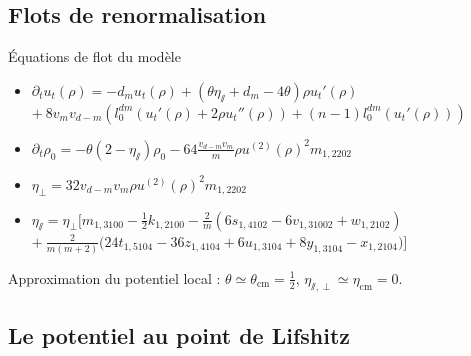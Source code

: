 \documentclass[xcolor=dvipsnames]{beamer}
\begin{document}
\subsection{Flots de renormalisation}
\begin{frame}

\begin{block}{Équations de flot du modèle}
\begin{itemize}
\item $\partial_t u_t(\rho) = -d_m u_t(\rho) + (\theta \eta_\sslash + d_m - 4 \theta) \rho u_t'(\rho)$ \\
\hfill $+~8 v_m v_{d-m} \left( l_0^{dm}\left(u_t'(\rho) + 2 \rho u_t''(\rho) \right) + (n-1)l_0^{dm}\left(u_t'(\rho)\right) \right)$

\item $\partial_t \rho_0 = -\theta \left(2-\eta_\sslash\right) \rho_0 - 64 \frac{ v_{d-m} v_m}{m} \rho u^{(2)}(\rho)^2 m_{1,2202} $

\item $\eta_\perp = 32 v_{d-m} v_m \rho u^{(2)}(\rho)^2  m_{1,2202}$

\item $\eta_\sslash = \eta_\perp  \Big[ m_{1,3100} - \frac{1}{2} k_{1,2100}-\frac{2}{m}\left( 6 s_{1,4102}-6 v_{1,31002}+ w_{1,2102} \right)$ \\
\hfill$+~\frac{2}{m(m+2)}\big( 24 t_{1,5104} -36 z_{1,4104}+6 u_{1,3104} +8 y_{1,3104} - x_{1,2104} \big) \Big]$
\end{itemize}
\end{block}

Approximation du potentiel local : $\theta \simeq \theta_{\text{cm}} = \frac{1}{2}$, $\eta_{\sslash, \perp} \simeq \eta_{\text{cm}} = 0$.
\end{frame}

\subsection{Le potentiel au point de Lifshitz}
\end{document}
